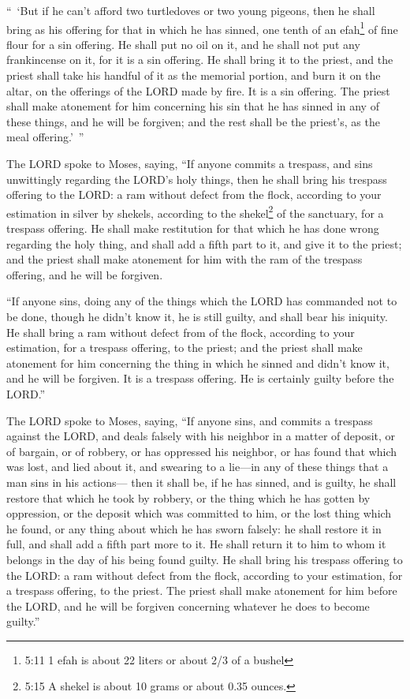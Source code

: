 \myverse{}“ ‘But if he can’t afford two turtledoves or two young pigeons,
then he shall bring as his offering for that in which he has sinned, one tenth of an efah\footnote{5:11 1 efah is about 22 liters or about 2/3 of a bushel} of fine flour for a sin offering.
He shall put no oil on it, and he shall not put any frankincense on it, for it is a sin offering.
\myverse{}He shall bring it to the priest, and the priest shall take his handful of
it as the memorial portion, and burn it on the altar, on the offerings of the LORD made by fire. It is
a sin offering.
\myverse{}The priest shall make atonement for him concerning his sin that he has sinned
in any of these things, and he will be forgiven; and the rest shall be the priest’s, as the meal offering.’ ”


\myverse{}The LORD spoke to Moses, saying,
\myverse{}“If anyone commits a trespass, and sins unwittingly regarding the LORD’s holy
things, then he shall bring his trespass offering to the LORD: a ram without defect from the flock, according
to your estimation in silver by shekels, according to the shekel\footnote{5:15 A shekel is about 10 grams or about 0.35 ounces.} of the sanctuary, for a trespass offering.
\myverse{}He shall make restitution for that which he has done wrong regarding the holy
thing, and shall add a fifth part to it, and give it to the priest; and the priest shall make atonement
for him with the ram of the trespass offering, and he will be forgiven.


\myverse{}“If anyone sins, doing any of the things which the LORD has commanded
not to be done, though he didn’t know it, he is still guilty, and shall bear his iniquity.
\myverse{}He shall bring a ram without defect from of the flock, according to your estimation,
for a trespass offering, to the priest; and the priest shall make atonement for him concerning the thing
in which he sinned and didn’t know it, and he will be forgiven.
\myverse{}It is a trespass offering. He is certainly guilty before the LORD.”


\mychapter{} \myverse*{}The LORD spoke to Moses, saying,
\myverse{}“If anyone sins, and commits a trespass against the LORD, and deals falsely
with his neighbor in a matter of deposit, or of bargain, or of robbery, or has oppressed his neighbor,
\myverse{}or has found that which was lost, and lied about it, and swearing to a lie—in
any of these things that a man sins in his actions—
\myverse{}then it shall be, if he has sinned, and is guilty, he shall restore that which
he took by robbery, or the thing which he has gotten by oppression, or the deposit which was committed
to him, or the lost thing which he found,
\myverse{}or any thing about which he has sworn falsely: he shall restore it in full,
and shall add a fifth part more to it. He shall return it to him to whom it belongs in the day of his
being found guilty.
\myverse{}He shall bring his trespass offering to the LORD: a ram without defect from
the flock, according to your estimation, for a trespass offering, to the priest.
\myverse{}The priest shall make atonement for him before the LORD, and he will be forgiven
concerning whatever he does to become guilty.”


